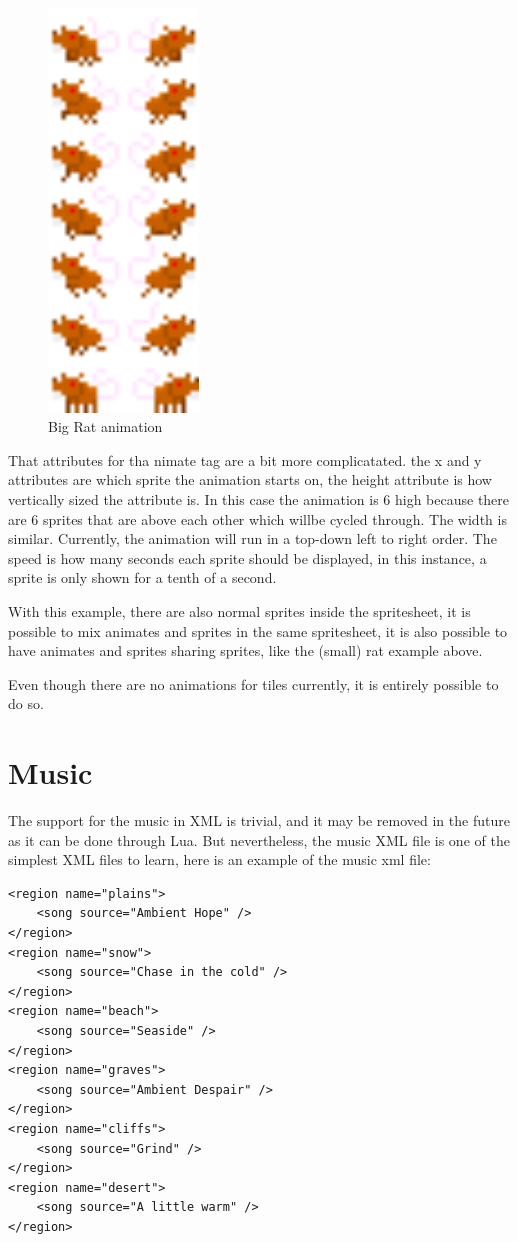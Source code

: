 \documentclass{book}
\begin{document}
\begin{figure}[ht!]
		\centering
		\includegraphics[width=40mm]{BigRatAnim.png}
		\caption{Big Rat animation}
\end{figure}

That attributes for tha nimate tag are a bit more complicatated. the x and y attributes are which sprite the animation starts on, the height attribute is how vertically sized the attribute is. In this case the animation is 6 high because there are 6 sprites that are above each other which willbe cycled through. The width is similar. Currently, the animation will run in a top-down left to right order. The speed is how many seconds each sprite should be displayed, in this instance, a sprite is only shown for a tenth of a second.

With this example, there are also normal sprites inside the spritesheet, it is possible to mix animates and sprites in the same spritesheet, it is also possible to have animates and sprites sharing sprites, like the (small) rat example above.

Even though there are no animations for tiles currently, it is entirely possible to do so.

\section{Music}
The support for the music in XML is trivial, and it may be removed in the future as it can be done through Lua. But nevertheless, the music XML file is one of the simplest XML files to learn, here is an example of the music xml file:
\begin{verbatim}
<region name="plains">
	<song source="Ambient Hope" />
</region>
<region name="snow">
	<song source="Chase in the cold" />
</region>
<region name="beach">
	<song source="Seaside" />
</region>
<region name="graves">
    <song source="Ambient Despair" />
</region>
<region name="cliffs">
	<song source="Grind" />
</region>
<region name="desert">
	<song source="A little warm" />
</region>
\end{verbatim}
\end{document}

